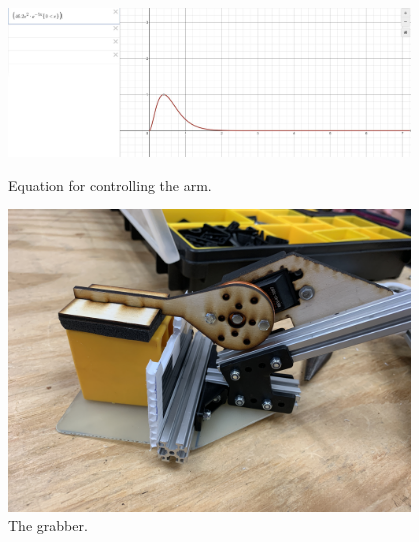 \begin{figure}[ht]
\centering
\begin{minipage}[b]{.48\textwidth}
  \centering
  \includegraphics[width=0.95\textwidth]{Meetings/October/10-12-21/10-12-21_Team_Figure3 - Nathan Forrer.PNG}
  \caption{Equation for controlling the arm.}
  \label{fig:pic3}
\end{minipage}%
\hfill%
\begin{minipage}[b]{.48\textwidth}
  \centering
  \includegraphics[width=0.95\textwidth]{Meetings/October/10-12-21/10-12-21_Team_Figure4 - Nathan Forrer.JPG}
  \caption{The grabber.}
  \label{fig:pic4}
\end{minipage}
\end{figure}